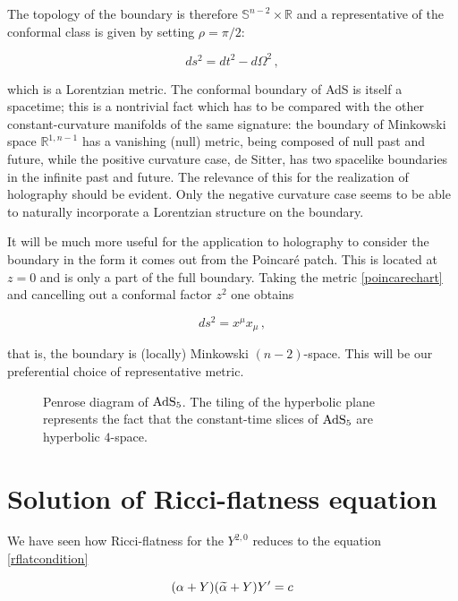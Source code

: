 The topology of the boundary is therefore $\mathbb{S}^{n-2} \times \mathbb{R}$ and a representative of the conformal class is given by setting $\rho = \pi/2$:

\begin{equation}
	ds^2 = dt^2 - d\Omega^2 \,,
\end{equation}

which is a Lorentzian metric. The conformal boundary of AdS is itself a spacetime; this is a nontrivial fact which has to be compared with the other constant-curvature manifolds of the same signature: the boundary of Minkowski space $\mathbb{R}^{1,n-1}$ has a vanishing (null) metric, being composed of null past and future, while the positive curvature case, de Sitter, has two spacelike boundaries in the infinite past and future. The relevance of this for the realization of holography should be evident. Only the negative curvature case seems to be able to naturally incorporate a Lorentzian structure on the boundary.

It will be much more useful for the application to holography to consider the boundary in the form it comes out from the Poincaré patch. This is located at $z=0$ and is only a part of the full boundary. Taking the metric \ref{poincarechart} and cancelling out a conformal factor $z^2$ one obtains

\begin{equation}
	ds^2 = x^\mu x_\mu\,,
\end{equation}

that is, the boundary is (locally) Minkowski $(n-2)$-space. This will be our preferential choice of representative metric.

\begin{figure}
\centering
\def\svgwidth{200pt}
\captionsetup{width=0.8\textwidth}

\caption{Penrose diagram of $\operatorname{AdS}_{5}$. The tiling of the hyperbolic plane represents the fact that the constant-time slices of $\operatorname{AdS}_{5}$ are hyperbolic $4$-space.}
\end{figure}


\section{Solution of Ricci-flatness equation}\label{appendix:solutioncubic}

We have seen how Ricci-flatness for the $Y^{2,0}$ reduces to the equation \eqref{rflatcondition}

\begin{equation}\label{rflatcondition2}
	(\alpha+Y)(\widetilde{\alpha} + Y) Y' = c
\end{equation}

